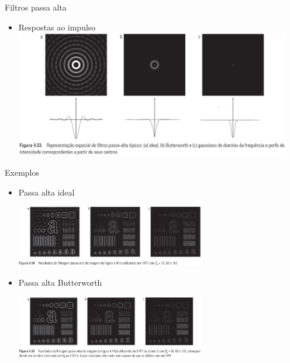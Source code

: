       \begin{slide}[toc=]{Filtros passa alta}
         \begin{itemize}[type=1]
            \item Respostas ao impulso
            \includegraphics[width=0.95\textwidth]{figs/fig0453}
         \end{itemize}
      \end{slide}
      
      \begin{slide}[toc=]{Exemplos}
         \begin{itemize}[type=1]
            \item Passa alta ideal
	      \begin{center}
            \includegraphics[width=0.65\textwidth]{figs/fig0454}
	      \end{center}
            \item Passa alta Butterworth
	      \begin{center}
            \includegraphics[width=0.65\textwidth]{figs/fig0455}
	      \end{center}
         \end{itemize}
      \end{slide}
      
